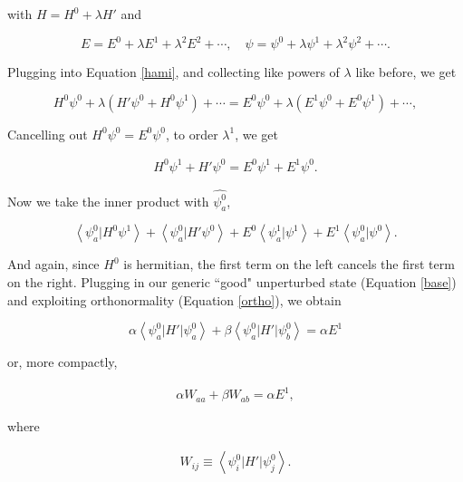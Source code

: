 \documentclass[svgnames]{article}     %
\begin{document}
with $H = H^{0} + \lambda H'$ and 

\[
E = E^{0} + \lambda E^{1} + \lambda ^2 E^2 + \cdots, \quad \psi = \psi^{0}
+ \lambda \psi^{1} + \lambda^2 \psi^2 + \cdots.
\] \vspace{3px}

Plugging into Equation \ref{hami}, and collecting like powers of $\lambda$ like
before, we get 

\[
H^{0}\psi^{0} + \lambda\left(H'\psi^{0} + H^{0}\psi^{1}\right) + \cdots
= E^{0}\psi^{0} + \lambda \left( E^{1}\psi^{0} + E^{0}\psi^{1} \right)
+ \cdots,  
\] \vspace{3px}

Cancelling out $H^{0}\psi^{0} = E^{0}\psi^{0}$, to order $\lambda^1$, we get 

\begin{align} \label{}
  H^0\psi^{1} + H'\psi^{0} = E^{0} \psi^{1} + E^{1}\psi^{0}. 
\end{align}\vspace{3px}


Now we take the inner product with $\hat{\psi_a^{0}}$, 

\[
\left\langle \psi_a^{0}| H^{0} \psi^{1} \right\rangle + \left\langle \psi_a^{0} | H' \psi^{0}
\right\rangle + E^{0} \left\langle \psi_a^{1} | \psi^{1} \right\rangle + E^{1}
\left\langle
\psi_a^{0}|\psi^{0} \right\rangle. 
\] \vspace{3px}


And again, since $H^{0}$ is hermitian, the first term on the left cancels the
first term on the right. Plugging in our generic ``good" unperturbed state
(Equation \ref{base}) and exploiting orthonormality (Equation \ref{ortho}), we
obtain 

\[
\alpha \left\langle \psi_a^{0} | H' | \psi_a^{0} \right\rangle + \beta \left\langle
\psi_a^{0} | H' | \psi_b^{0} \right\rangle = \alpha E^{1}
\] \vspace{3px}

or, more compactly, 

\begin{align} \label{w}
  \alpha W_{aa} + \beta W_{ab} = \alpha E^{1},
\end{align}\vspace{3px}


where 

\begin{align} \label{wdef}
  W_{ij} \equiv \left\langle \psi_i^{0} | H' | \psi_j^{0} \right\rangle. 
\end{align}\vspace{3px}
\end{document}
